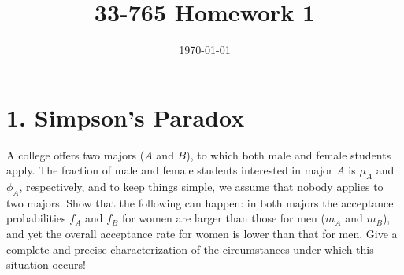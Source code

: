 \documentclass[a4paper,twoside]{article}
\title{33-765 Homework 1}
\date{\today}
\begin{document}
\maketitle
\section*{1. Simpson's Paradox}
A college offers two majors ($ A $ and $ B $), to which both male and female students apply. The fraction of male and female students
interested in major $ A $ is $ \mu_A $ and $ \phi_A $, respectively, and to keep things simple, we assume that nobody applies to two majors. Show that the following can happen: in both majors the acceptance probabilities $ f_A $  and $ f_B $ for women are larger than those for men ($ m_A $ and $ m_B $), and yet the overall acceptance rate for women is lower than that for men. Give a complete and precise characterization of the circumstances under which this situation occurs!
\end{document}
